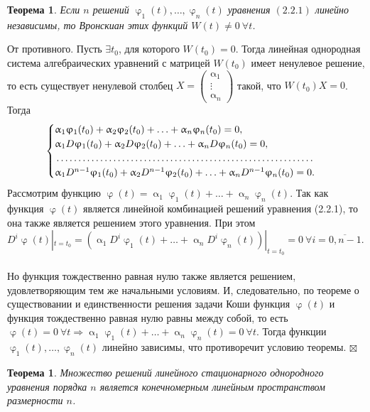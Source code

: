 \documentclass[a4paper, 12pt]{report}
\newenvironment{Proof} %
{\par\noindent{$\blacklozenge$}} %
{\hfill$\scriptstyle\boxtimes$}
\renewcommand{\alpha}{\upalpha}
\renewcommand{\varphi}{\upvarphi}
\begin{document}
	\newtheorem*{2_2_2}{Теорема} \begin{2_2_2} Если $n$ решений $\varphi_1(t), \ldots, \varphi_n(t)$ уравнения $(2.2.1)$ линейно независимы, то Вронскиан этих функций $W(t) \ne 0\ \forall t$.
	\end{2_2_2} \begin{Proof}
		От противного. Пусть $\exists t_0$, для которого $W(t_0) = 0$. Тогда линейная однородная система алгебраических уравнений с матрицей $W(t_0)$ имеет ненулевое решение, то есть существует ненулевой столбец $X = \begin{pmatrix}
			\alpha_1 \\ \vdots \\ \alpha_n
		\end{pmatrix}$ такой, что $W(t_0)X = 0$. Тогда $$\begin{cases}
			\alpha_1\varphi_1(t_0) + \alpha_2\varphi_2(t_0) + \ldots + \alpha_n\varphi_n(t_0) = 0,\\
			\alpha_1D\varphi_1(t_0) + \alpha_2D\varphi_2(t_0) + \ldots + \alpha_nD\varphi_n(t_0) = 0,\\
			\dotfill\\
			\alpha_1D^{n-1}\varphi_1(t_0) + \alpha_2D^{n-1}\varphi_2(t_0) + \ldots + \alpha_nD^{n-1}\varphi_n(t_0) = 0.
		\end{cases}$$ Рассмотрим функцию $\varphi(t) = \alpha_1\varphi_1(t) + \ldots + \alpha_n\varphi_n(t)$. Так как функция $\varphi(t)$ является линейной комбинацией решений уравнения (2.2.1), то она также является решением этого уравнения. При этом $D^i\varphi(t)|_{t=t_0} = (\alpha_1D^i\varphi_1(t) + \ldots + \alpha_nD^i\varphi_n(t))|_{t=t_0} = 0\ \forall i = \overline{0, n-1}$.\\\\
		Но функция тождественно равная нулю также является решением, удовлетворяющим тем же начальными условиям. И, следовательно, по теореме о существовании и единственности решения задачи Коши функция $\varphi(t)$ и функция тождественно равная нулю равны между собой, то есть $\varphi(t) = 0\ \forall t \Rightarrow \alpha_1\varphi_1(t) + \ldots + \alpha_n\varphi_n(t) = 0\ \forall t$. Тогда функции $\varphi_1(t),\ldots,\varphi_n(t)$ линейно зависимы, что противоречит условию теоремы.
	\end{Proof}
	\newtheorem*{2_2_3}{Теорема}\begin{2_2_3}
		Множество решений линейного стационарного однородного уравнения порядка $n$ является конечномерным линейным пространством размерности $n$.
	\end{2_2_3}
\end{document}

